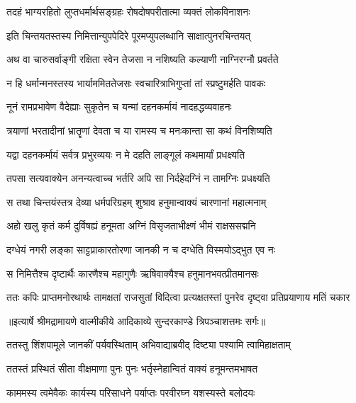 \twolineshloka
{तदहं भाग्यरहितो लुप्तधर्मार्थसङ्ग्रहः}
{रोषदोषपरीतात्मा व्यक्तं लोकविनाशनः} %

\twolineshloka
{इति चिन्तयतस्तस्य निमित्तान्युपपेदिरे}
{पूरमप्युपलब्धानि साक्षात्पुनरचिन्तयत्} %

\twolineshloka
{अथ वा चारुसर्वाङ्गी रक्षिता स्वेन तेजसा}
{न नशिष्यति कल्याणी नाग्निरग्नौ प्रवर्तते} %

\twolineshloka
{न हि धर्मान्मनस्तस्य भार्याममिततेजसः}
{स्वचारित्राभिगुप्तां तां स्प्रष्टुमर्हति पावकः} %

\twolineshloka
{नूनं रामप्रभावेण वैदेह्याः सुकृतेन च}
{यन्मां दहनकर्मायं नादहद्धव्यवाहनः} %

\twolineshloka
{त्रयाणां भरतादीनां भ्रातॄणां देवता च या}
{रामस्य च मनःकान्ता सा कथं विनशिष्यति} %

\twolineshloka
{यद्वा दहनकर्मायं सर्वत्र प्रभुरव्ययः}
{न मे दहति लाङ्गूलं कथमार्यां प्रधक्ष्यति} %

\twolineshloka
{तपसा सत्यवाक्येन अनन्यत्वाच्च भर्तरि}
{अपि सा निर्दहेदग्निं न तामग्निः प्रधक्ष्यति} %

\twolineshloka
{स तथा चिन्तयंस्तत्र देव्या धर्मपरिग्रहम्}
{शुश्राव हनुमान्वाक्यं चारणानां महात्मनाम्} %

\twolineshloka
{अहो खलु कृतं कर्म दुर्विषह्यं हनूमता}
{अग्निं विसृजताभीक्ष्णं भीमं राक्षससद्मनि} %

\twolineshloka
{दग्धेयं नगरी लङ्का साट्टप्राकारतोरणा}
{जानकी न च दग्धेति विस्मयोऽद्भुत एव नः} %

\twolineshloka
{स निमित्तैश्च दृष्टार्थैः कारणैश्च महागुणैः}
{ऋषिवाक्यैश्च हनुमानभवत्प्रीतमानसः} %

\fourlineindentedshloka
{ततः कपिः प्राप्तमनोरथार्थः}
{तामक्षतां राजसुतां विदित्वा}
{प्रत्यक्षतस्तां पुनरेव दृष्ट्वा}
{प्रतिप्रयाणाय मतिं चकार} %


{॥इत्यार्षे श्रीमद्रामायणे वाल्मीकीये आदिकाव्ये सुन्दरकाण्डे त्रिपञ्चाशत्तमः सर्गः॥}


\twolineshloka
{ततस्तु शिंशपामूले जानकीं पर्यवस्थिताम्}
{अभिवाद्याब्रवीद् दिष्ट्या पश्यामि त्वामिहाक्षताम्} %

\twolineshloka
{ततस्तं प्रस्थितं सीता वीक्षमाणा पुनः पुनः}
{भर्तृस्नेहान्वितं वाक्यं हनूमन्तमभाषत} %

\twolineshloka
{काममस्य त्वमेवैकः कार्यस्य परिसाधने}
{पर्याप्तः परवीरघ्न यशस्यस्ते बलोदयः} %

